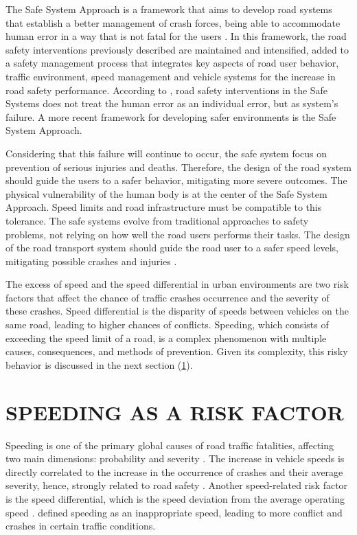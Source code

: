The Safe System Approach is a framework that aims to develop road systems that establish a better management of crash forces, being able to accommodate human error in a way that is not fatal for the users \cite{international_transport_forum_towards_2008}. In this framework, the road safety interventions previously described are maintained and intensified, added to a safety management process that integrates key aspects of road user behavior, traffic environment, speed management and vehicle systems for the increase in road safety performance. According to \textcite{larssonSafeSystemApproach2013}, road safety interventions in the Safe Systems does not treat the human error as an individual error, but as system's failure. A more recent framework for developing safer environments is the Safe System Approach. 

Considering that this failure will continue to occur, the safe system focus on prevention of serious injuries and deaths. Therefore, the design of the road system should guide the users to a safer behavior, mitigating more severe outcomes. The physical vulnerability of the human body is at the center of the Safe System Approach. Speed limits and road infrastructure must be compatible to this tolerance. The safe systems evolve from traditional approaches to safety problems, not relying on how well the road users performs their tasks. The design of the road transport system should guide the road user to a safer speed levels, mitigating possible crashes and injuries \cite{international_transport_forum_towards_2008,wegmanFutureRoadSafety2017}. 

The excess of speed and the speed differential in urban environments are two risk factors that affect the chance of traffic crashes occurrence and the severity of these crashes. Speed differential is the disparity of speeds between vehicles on the same road, leading to higher chances of conflicts. Speeding, which consists of exceeding the speed limit of a road, is a complex phenomenon with multiple causes, consequences, and methods of prevention. Given its complexity, this risky behavior is discussed in the next section (\ref{speeding}). 

\section{SPEEDING AS A RISK FACTOR} \label{speeding}

Speeding is one of the primary global causes of road traffic fatalities, affecting two main dimensions: probability and severity \cite{WHO2013}. The increase in vehicle speeds is directly correlated to the increase in the occurrence of crashes and their average severity, hence, strongly related to road safety \cite{Mohan2016a}. Another speed-related risk factor is the speed differential, which is the speed deviation from the average operating speed \cite{Shinar2017}. \textcite{Ferraz2012} defined speeding as an inappropriate speed, leading to more conflict and crashes in certain traffic conditions. 

